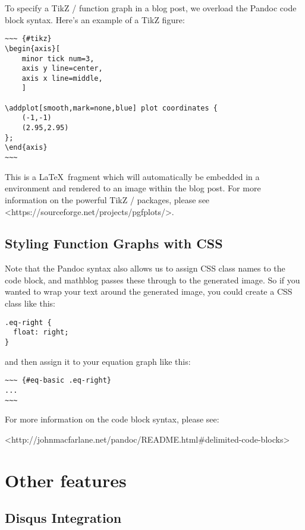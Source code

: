 \documentclass[11pt, letterpaper, oneside, titlepage]{book}
\begin{document}
To specify a TikZ /  function graph in a blog post, we
overload the Pandoc code block syntax.  Here's an example of a TikZ
figure:

\begin{verbatim}
~~~ {#tikz}
\begin{axis}[
    minor tick num=3,
    axis y line=center,
    axis x line=middle,
    ]

\addplot[smooth,mark=none,blue] plot coordinates {
    (-1,-1)
    (2.95,2.95)
};
\end{axis}
~~~
\end{verbatim}

This is a \LaTeX\ fragment which will automatically be embedded in a
 environment and rendered to an image within the blog
post.  For more information on the powerful TikZ / 
packages, please see <https://sourceforge.net/projects/pgfplots/>.

\subsection{Styling Function Graphs with CSS}

Note that the Pandoc syntax also allows us to assign CSS class names
to the code block, and mathblog passes these through to the generated
image.  So if you wanted to wrap your text around the generated image,
you could create a CSS class like this:

\begin{verbatim}
.eq-right {
  float: right;
}
\end{verbatim}

and then assign it to your equation graph like this:

\begin{verbatim}
~~~ {#eq-basic .eq-right}
...
~~~
\end{verbatim}

For more information on the code block syntax, please see:

<http://johnmacfarlane.net/pandoc/README.html\#delimited-code-blocks>

\section{Other features}

\subsection{Disqus Integration}
\end{document}
